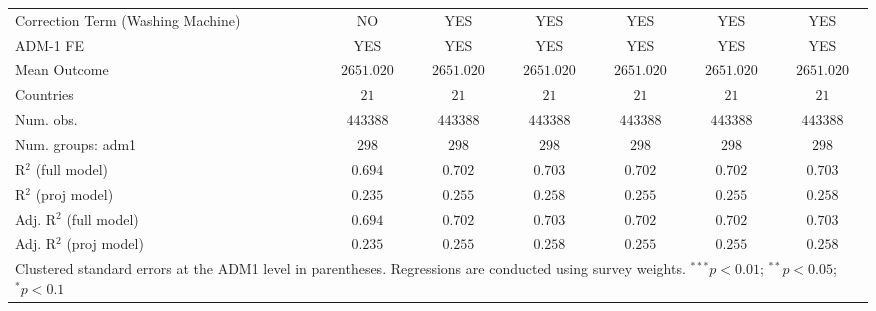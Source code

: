 \begin{table}[htbp]
\begin{center}
\begin{tabular}{l c c c c c c}
Correction Term (Washing Machine) & NO            & YES           & YES           & YES           & YES           & YES           \\
ADM-1 FE                          & YES           & YES           & YES           & YES           & YES           & YES           \\
Mean Outcome                      & $2651.020$    & $2651.020$    & $2651.020$    & $2651.020$    & $2651.020$    & $2651.020$    \\
Countries                         & $21$          & $21$          & $21$          & $21$          & $21$          & $21$          \\
Num. obs.                         & $443388$      & $443388$      & $443388$      & $443388$      & $443388$      & $443388$      \\
Num. groups: adm1                 & $298$         & $298$         & $298$         & $298$         & $298$         & $298$         \\
R$^2$ (full model)                & $0.694$       & $0.702$       & $0.703$       & $0.702$       & $0.702$       & $0.703$       \\
R$^2$ (proj model)                & $0.235$       & $0.255$       & $0.258$       & $0.255$       & $0.255$       & $0.258$       \\
Adj. R$^2$ (full model)           & $0.694$       & $0.702$       & $0.703$       & $0.702$       & $0.702$       & $0.703$       \\
Adj. R$^2$ (proj model)           & $0.235$       & $0.255$       & $0.258$       & $0.255$       & $0.255$       & $0.258$       \\
\hline
\multicolumn{7}{l}{\scriptsize{Clustered standard errors at the ADM1 level in parentheses. Regressions are conducted using survey weights. $^{***}p<0.01$; $^{**}p<0.05$; $^{*}p<0.1$}}
\end{tabular}
\label{main: tableA13}
\end{center}
\end{table}
